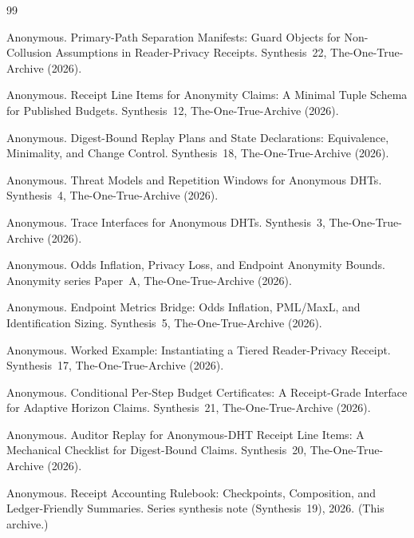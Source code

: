 \documentclass[11pt]{article}
\begin{document}
\begin{thebibliography}{99}\small

Anonymous.
\newblock Primary-Path Separation Manifests: Guard Objects for Non-Collusion Assumptions in Reader-Privacy Receipts.
\newblock Synthesis~22, The-One-True-Archive (2026).

Anonymous.
\newblock Receipt Line Items for Anonymity Claims: A Minimal Tuple Schema for Published Budgets.
\newblock Synthesis~12, The-One-True-Archive (2026).

Anonymous.
\newblock Digest-Bound Replay Plans and State Declarations: Equivalence, Minimality, and Change Control.
\newblock Synthesis~18, The-One-True-Archive (2026).

Anonymous.
\newblock Threat Models and Repetition Windows for Anonymous DHTs.
\newblock Synthesis~4, The-One-True-Archive (2026).

Anonymous.
\newblock Trace Interfaces for Anonymous {DHT}s.
\newblock Synthesis~3, The-One-True-Archive (2026).

Anonymous.
\newblock Odds Inflation, Privacy Loss, and Endpoint Anonymity Bounds.
\newblock Anonymity series Paper~A, The-One-True-Archive (2026).

Anonymous.
\newblock Endpoint Metrics Bridge: Odds Inflation, PML/MaxL, and Identification Sizing.
\newblock Synthesis~5, The-One-True-Archive (2026).

Anonymous.
\newblock Worked Example: Instantiating a Tiered Reader-Privacy Receipt.
\newblock Synthesis~17, The-One-True-Archive (2026).

Anonymous.
\newblock Conditional Per-Step Budget Certificates: A Receipt-Grade Interface for Adaptive Horizon Claims.
\newblock Synthesis~21, The-One-True-Archive (2026).

Anonymous.
\newblock Auditor Replay for Anonymous-DHT Receipt Line Items: A Mechanical Checklist for Digest-Bound Claims.
\newblock Synthesis~20, The-One-True-Archive (2026).


Anonymous.
\newblock Receipt Accounting Rulebook: Checkpoints, Composition, and Ledger-Friendly Summaries.
\newblock Series synthesis note (Synthesis~19), 2026. (This archive.)

\end{thebibliography}
\end{document}
